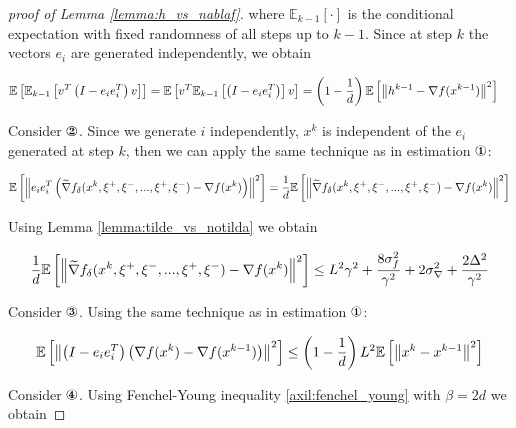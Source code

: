 \begin{proof}[proof of Lemma \ref{lemma:h_vs_nablaf}]
        where $\mathbb{E}_{k-1}[\cdot]$ is the conditional expectation with fixed randomness of all steps up to $k-1$. Since at step $k$ the vectors $e_i$ are generated independently, we obtain

        \begin{equation*}
        \begin{split}
            \mathbb{E}\left[ \mathbb{E}_{k-1}\left[ v^T\left(I - e_i e_i^T\right) v \right] \right]
            &=
            \mathbb{E}\left[ v^T\mathbb{E}_{k-1}\left[\left(I - e_i e_i^T\right) \right] v \right] = \left(1 - \frac{1}{d}\right) \mathbb{E}\left[ \left\| h^{k-1} - \nabla f(x^{k-1}) \right\|^2 \right]
        \end{split}
        \end{equation*}

        Consider $\circledTwo$. Since we generate $i$ independently, $x^k$ is independent of the $e_i$ generated at step $k$, then we can apply the same technique as in estimation $\circledOne$:

        \begin{equation*}
            \mathbb{E}\left[ \left\| e_i e_i^T \left(\widetilde{\nabla} f_\delta(x^k, \xi^+, \xi^-, ..., \xi^+, \xi^-) - \nabla f(x^k) \right) \right\|^2 \right] 
            =
            \frac{1}{d} \mathbb{E}\left[ \left\| \widetilde{\nabla} f_\delta(x^k, \xi^+, \xi^-, ..., \xi^+, \xi^-) - \nabla f(x^k) \right\|^2 \right]
        \end{equation*}

        Using Lemma \ref{lemma:tilde_vs_notilda} we obtain 

        \begin{equation*}
            \frac{1}{d} \mathbb{E}\left[ \left\| \widetilde{\nabla} f_\delta(x^k, \xi^+, \xi^-, ..., \xi^+, \xi^-) - \nabla f(x^k) \right\|^2 \right]
            \leq
            L^2 \gamma^2 
            + \frac{8 \sigma_f^2}{\gamma^2} 
            + 2 \sigma_{\nabla}^2 + \frac{2 \Delta^2}{\gamma^2}
        \end{equation*}

        Consider $\circledThree$. Using the same technique as in estimation $\circledOne$:

        \begin{equation*}
            \mathbb{E}\left[ \left\| \left(I - e_i e_i^T\right) \left(\nabla f(x^{k}) - \nabla f(x^{k-1})\right) \right\|^2 \right] \leq \left(1 - \frac{1}{d}\right) L^2 \mathbb{E}\left[ \left\| x^k - x^{k-1} \right\|^2 \right]
        \end{equation*}

        Consider $\circledFour$. Using Fenchel-Young inequality \ref{axil:fenchel_young} with $\beta = 2d$ we obtain


\end{proof}
